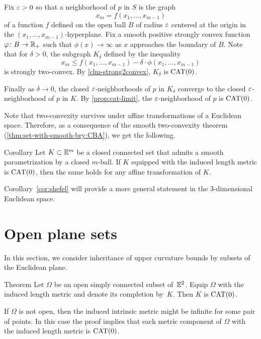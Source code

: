 Fix $\varepsilon>0$ so that a neighborhood of $p$ in $S$ 
is the graph
\[x_m= f(x_1,\ldots,x_{m-1})\]
of a function $f$ defined on the open ball $B$ of radius $\varepsilon$ centered at the origin in the $(x_1,\ldots,x_{m-1})$-hyperplane.
Fix a smooth positive 
strongly 
convex function $\varphi\colon B\to \mathbb{R}_+$
such that $\phi(x)\to\infty$ as $x$ approaches the boundary of $B$.
Note that for $\delta>0$, the subgraph $K_\delta$ defined by the inequality
\[x_m\le f(x_1,\ldots,x_{m-1})-\delta\cdot\phi(x_1,\ldots,x_{m-1})\]
is strongly two-convex.
By \ref{clm-strong2convex}, $K_\delta$ is $\mathrm{CAT}(0)$.

Finally as $\delta\to0$, the closed $\varepsilon$-neighborhoods of $p$ in $K_\delta$ 
converge to the closed $\varepsilon$-neighborhood of $p$ in $K$.
By \ref{prop:cat-limit}, the $\varepsilon$-neighborhood of $p$ is $\mathrm{CAT}(0)$.
\qeds

Note that two-convexity survives under affine transformations of a Euclidean space.
Therefore, as a consequence of the smooth two-convexity theorem (\ref{thm:set-with-smooth-bry:CBA}), we get the following.

\begin{thm}{Corollary}\label{cor:affine}
Let $K\subset \mathbb{E}^m$ be a closed connected set that admits a smooth parametrization by a closed $m$-ball.
If $K$ equipped with the induced length metric is $\mathrm{CAT}(0)$, then the same holds for any affine transformation of $K$.
\end{thm}

Corollary~\ref{cor:shefel} will provide a more general statement in the 3-dimensional Euclidean space.

\section{Open plane sets}

In this section, we consider inheritance of upper curvature bounds by subsets of the Euclidean plane.

\begin{thm}{Theorem}\label{thm:bishop-plane}
Let $\Omega$ be an open simply connected subset of~$\mathbb{E}^2$.
Equip $\Omega$ with the induced length metric and denote its completion 
by~$K$.
Then $K$ is $\mathrm{CAT}(0)$.
\end{thm}

If $\Omega$ is not open, then the induced intrinsic metric might be infinite for some pair of points.
In this case the proof implies that each metric component of $\Omega$ with the induced length metric is $\mathrm{CAT}(0)$.

